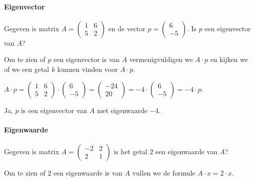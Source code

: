 \documentclass[11pt]{article}
\begin{document}
    \hypertarget{eigenvector}{%
\paragraph{Eigenvector}\label{eigenvector}}

Gegeven is matrix \(A=\begin{pmatrix}1&6\\5&2\end{pmatrix}\) en de
vector \(p=\begin{pmatrix}6\\-5\end{pmatrix}\). Is \(p\) een eigenvector
van \(A\)?

Om te zien of \(p\) een eigenvector is van \(A\) vermenigvuldigen we
\(A \cdot p\) en kijken we of we een getal \(k\) kunnen vinden voor
\(A \cdot p\).

\(A\cdot p = \begin{pmatrix}1&6\\5&2\end{pmatrix}\cdot\begin{pmatrix}6\\-5\end{pmatrix}=\begin{pmatrix}-24\\20\end{pmatrix}=-4\cdot\begin{pmatrix}6\\-5\end{pmatrix}=-4\cdot p\).

Ja, \(p\) is een eigenvector van \(A\) met eigenwaarde \(-4\).

    \hypertarget{eigenwaarde}{%
\paragraph{Eigenwaarde}\label{eigenwaarde}}

    Gegeven is matrix \(A=\begin{pmatrix}-2&2\\2&1\end{pmatrix}\) is het
getal \(2\) een eigenwaarde van \(A\)?

Om te zien of \(2\) een eigenwaarde is van \(A\) vullen we de formule
\(A \cdot x = 2 \cdot x\).
\end{document}
